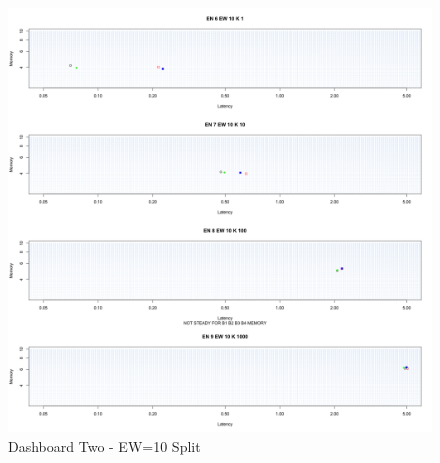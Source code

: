 \begin{figure}[htbp]
	\centering
	\includegraphics[width=0.90\linewidth]{images/dashboard-2-split}	
	\caption[\textsc{Analyser} Investigation Stack - Level 0 - Dashboard Two - Split Version]{Dashboard Two - EW=10 Split} 
	\label{fig:result_dashboard_ewa}
\end{figure}

